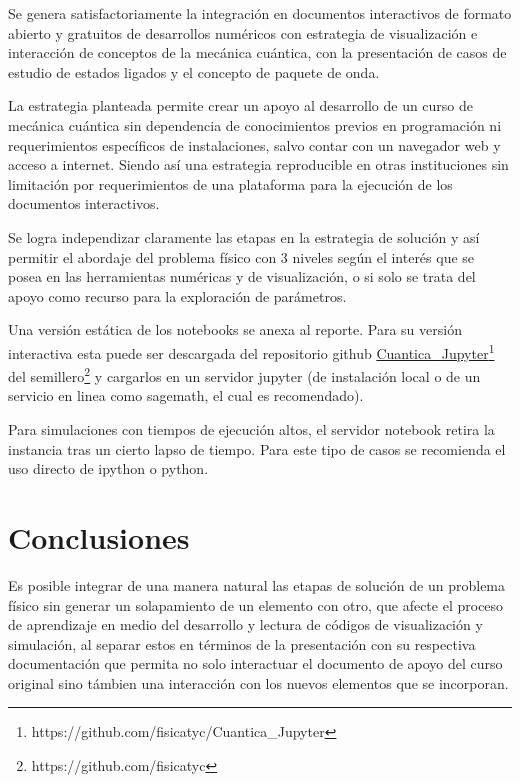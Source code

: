 \documentclass{article}
\begin{document}
Se genera satisfactoriamente la integración en documentos interactivos de formato abierto y gratuitos de desarrollos numéricos con estrategia de visualización e interacción de conceptos de la mecánica cuántica, con la presentación de casos de estudio de estados ligados y el concepto de paquete de onda.

La estrategia planteada permite crear un apoyo al desarrollo de un curso de mecánica cuántica sin dependencia de conocimientos previos en programación ni requerimientos específicos de instalaciones, salvo contar con un navegador web y acceso a internet. Siendo así una estrategia reproducible en otras instituciones sin limitación por requerimientos de una plataforma para la ejecución de los documentos interactivos.

Se logra independizar claramente las etapas en la estrategia de solución y así permitir el abordaje del problema físico con 3 niveles según el interés que se posea en las herramientas numéricas y de visualización, o si solo se trata del apoyo como recurso para la exploración de parámetros.

Una versión estática de los notebooks se anexa al reporte. Para su versión interactiva esta puede ser descargada del repositorio github \href{https://github.com/fisicatyc/Cuantica\_Jupyter}{Cuantica\_Jupyter}\footnote{https://github.com/fisicatyc/Cuantica\_Jupyter} del semillero\footnote{https://github.com/fisicatyc} y cargarlos en un servidor jupyter (de instalación local o de un servicio en linea como sagemath, el cual es recomendado).

Para simulaciones con tiempos de ejecución altos, el servidor notebook retira la instancia tras un cierto lapso de tiempo. Para este tipo de casos se recomienda el uso directo de ipython o python.

\section{Conclusiones}

Es posible integrar de una manera natural las etapas de solución de un problema físico sin generar un solapamiento de un elemento con otro, que afecte el proceso de aprendizaje en medio del desarrollo y lectura de códigos de visualización y simulación, al separar estos en términos de la presentación con su respectiva documentación que permita no solo interactuar el documento de apoyo del curso original sino támbien una interacción con los nuevos elementos que se incorporan.
\end{document}
